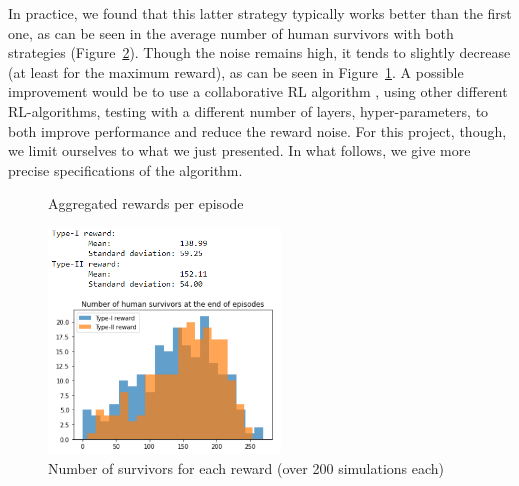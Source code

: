 \documentclass[11pt]{article}
\begin{document}
In practice, we found that this latter strategy typically works better than the first one, as can be seen in the average number of human survivors with both strategies (Figure~\ref{fig:survivors_histograms}). Though the noise remains high, it tends to slightly decrease (at least for the maximum reward), as can be seen in Figure~\ref{fig:stochastic_rewards}. A possible improvement would be to use a collaborative RL algorithm \cite{CDRL}, using other different RL-algorithms, testing with a different number of layers, hyper-parameters, to both improve performance and reduce the reward noise. For this project, though, we limit ourselves to what we just presented. In what follows, we give more precise specifications of the algorithm.

\begin{figure}[H]
    \centering
    \caption{Aggregated rewards per episode}
    \label{fig:stochastic_rewards}
\end{figure}

\begin{figure}[H]
    \centering
    \includegraphics[width=0.55\textwidth]{fig/survivors.PNG}
    \caption{Number of survivors for each reward (over 200 simulations each)}
    \label{fig:survivors_histograms}
\end{figure}
\end{document}
